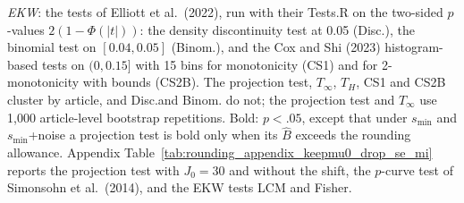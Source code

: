 \begin{table}[htbp]
\begin{minipage}{\linewidth}
\textit{EKW}: the tests of Elliott et al.\ (2022), run with their Tests.R on the two-sided $p$-values $2(1-\Phi(|t|))$: the density discontinuity test at 0.05 (Disc.), the binomial test on $[0.04,0.05]$ (Binom.), and the Cox and Shi (2023) histogram-based tests on $(0,0.15]$ with 15 bins for monotonicity (CS1) and for 2-monotonicity with bounds (CS2B).
The projection test, $T_\infty$, $T_H$, CS1 and CS2B cluster by article, and Disc.\@ and Binom. do not; the projection test and $T_\infty$ use 1,000 article-level bootstrap repetitions.
Bold: $p<.05$, except that under $s_{\min}$ and $s_{\min}$+noise a projection test is bold only when its $\widehat{B}$ exceeds the rounding allowance.
Appendix Table~\ref{tab:rounding_appendix_keepmu0_drop_se_mi} reports the projection test with $J_0=30$ and without the shift, the $p$-curve test of Simonsohn et al.\ (2014), and the EKW tests LCM and Fisher.
\end{minipage}
\end{table}
